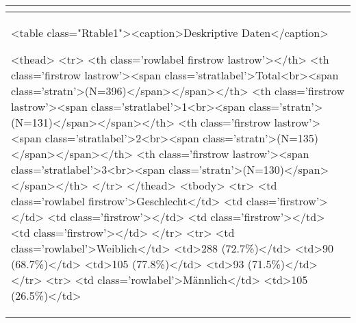 \begin{table}[!tbp]
\begin{center}
\begin{tabular}{l}
\hline\hline
\multicolumn{1}{c}{}\tabularnewline
\hline
\textless table class="Rtable1"\textgreater \textless caption\textgreater Deskriptive Daten\textless /caption\textgreater 

\textless thead\textgreater 
\textless tr\textgreater 
\textless th class='rowlabel firstrow lastrow'\textgreater \textless /th\textgreater 
\textless th class='firstrow lastrow'\textgreater \textless span class='stratlabel'\textgreater Total\textless br\textgreater \textless span class='stratn'\textgreater (N=396)\textless /span\textgreater \textless /span\textgreater \textless /th\textgreater 
\textless th class='firstrow lastrow'\textgreater \textless span class='stratlabel'\textgreater 1\textless br\textgreater \textless span class='stratn'\textgreater (N=131)\textless /span\textgreater \textless /span\textgreater \textless /th\textgreater 
\textless th class='firstrow lastrow'\textgreater \textless span class='stratlabel'\textgreater 2\textless br\textgreater \textless span class='stratn'\textgreater (N=135)\textless /span\textgreater \textless /span\textgreater \textless /th\textgreater 
\textless th class='firstrow lastrow'\textgreater \textless span class='stratlabel'\textgreater 3\textless br\textgreater \textless span class='stratn'\textgreater (N=130)\textless /span\textgreater \textless /span\textgreater \textless /th\textgreater 
\textless /tr\textgreater 
\textless /thead\textgreater 
\textless tbody\textgreater 
\textless tr\textgreater 
\textless td class='rowlabel firstrow'\textgreater Geschlecht\textless /td\textgreater 
\textless td class='firstrow'\textgreater \textless /td\textgreater 
\textless td class='firstrow'\textgreater \textless /td\textgreater 
\textless td class='firstrow'\textgreater \textless /td\textgreater 
\textless td class='firstrow'\textgreater \textless /td\textgreater 
\textless /tr\textgreater 
\textless tr\textgreater 
\textless td class='rowlabel'\textgreater Weiblich\textless /td\textgreater 
\textless td\textgreater 288 (72.7\%)\textless /td\textgreater 
\textless td\textgreater 90 (68.7\%)\textless /td\textgreater 
\textless td\textgreater 105 (77.8\%)\textless /td\textgreater 
\textless td\textgreater 93 (71.5\%)\textless /td\textgreater 
\textless /tr\textgreater 
\textless tr\textgreater 
\textless td class='rowlabel'\textgreater Männlich\textless /td\textgreater 
\textless td\textgreater 105 (26.5\%)\textless /td\textgreater 

\end{tabular}
\end{center}
\end{table}
